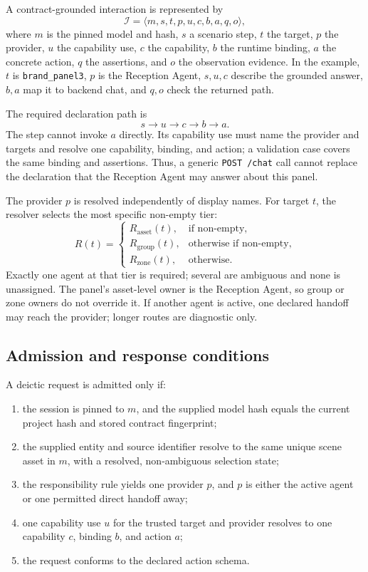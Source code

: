 A contract-grounded interaction is represented by
\[
\mathcal{I} =
\langle m,s,t,p,u,c,b,a,q,o\rangle ,
\]
where \(m\) is the pinned model and hash, \(s\) a scenario step, \(t\) the
target, \(p\) the provider, \(u\) the capability use, \(c\) the capability,
\(b\) the runtime binding, \(a\) the concrete action, \(q\) the assertions,
and \(o\) the observation evidence.  In the example, \(t\) is
\texttt{brand\_panel3}, \(p\) is the Reception Agent, \(s,u,c\) describe the
grounded answer, \(b,a\) map it to backend chat, and \(q,o\) check the
returned path.

The required declaration path is
\[
s \rightarrow u \rightarrow c \rightarrow b \rightarrow a.
\]
The step cannot invoke \(a\) directly.  Its capability use must name the
provider and targets and resolve one capability, binding, and action; a
validation case covers the same binding and assertions.  Thus, a generic
\texttt{POST /chat} call cannot replace the declaration that the Reception
Agent may answer about this panel.

The provider \(p\) is resolved independently of display names.  For target
\(t\), the resolver selects the most specific non-empty tier:
\[
R(t) =
\begin{cases}
R_{\mathrm{asset}}(t), & \text{if non-empty},\\
R_{\mathrm{group}}(t), & \text{otherwise if non-empty},\\
R_{\mathrm{zone}}(t), & \text{otherwise}.
\end{cases}
\]
Exactly one agent at that tier is required; several are ambiguous and none is
unassigned.  The panel's asset-level owner is the Reception Agent, so group or
zone owners do not override it.  If another agent is active, one declared
handoff may reach the provider; longer routes are diagnostic only.

\subsection{Admission and response conditions}

A deictic request is admitted only if:

\begin{enumerate}
  \item the session is pinned to \(m\), and the supplied model hash equals the
  current project hash and stored contract fingerprint;
  \item the supplied entity and source identifier resolve to the same unique
  scene asset in \(m\), with a resolved, non-ambiguous selection state;
  \item the responsibility rule yields one provider \(p\), and \(p\) is either
  the active agent or one permitted direct handoff away;
  \item one capability use \(u\) for the trusted target and provider resolves to
  one capability \(c\), binding \(b\), and action \(a\);
  \item the request conforms to the declared action schema.
\end{enumerate}

